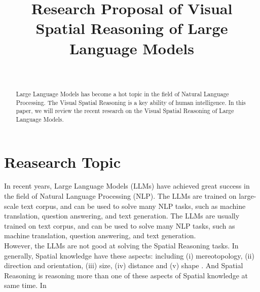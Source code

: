 \documentclass[journal,10pt]{IEEEtran}
\author{
    \IEEEauthorblockN{Jinlong Liu}\\
    \IEEEauthorblockA{Department of Computer Science, University of Liverpool
    \\J.Liu157@liverpool.ac.uk}
}
\title{Research Proposal of Visual Spatial Reasoning of Large Language Models}
\begin{document}
\maketitle
\begin{abstract}
Large Language Models has become a hot topic in the field of Natural Language Processing. The Visual Spatial Reasoning is a key ability of human intelligence. In this paper, we will review the recent research on the Visual Spatial Reasoning of Large Language Models.
\end{abstract}
\section{Reasearch Topic}
In recent years, Large Language Models (LLMs) have achieved great success in the field of Natural Language Processing (NLP). The LLMs are trained on large-scale text corpus, and can be used to solve many NLP tasks, such as machine translation, question answering, and text generation. The LLMs are usually trained on text corpus, and can be used to solve many NLP tasks, such as machine translation, question answering, and text generation. \\
However, the LLMs are not good at solving the Spatial Reasoning tasks. In generally, Spatial knowledge have these aspects: including (i) mereotopology, (ii) direction and orientation, (iii) size, (iv) distance and (v) shape \cite{cohn2008qualitative}. And Spatial Reasoning is  reasoning more than one of these aspects of Spatial knowledge at same time. In 




\end{document}
